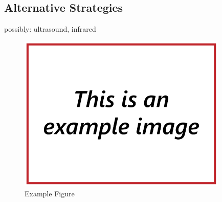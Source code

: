 \subsection{\label{sec:intro:alternatives}Alternative Strategies}
possibly: ultrasound, infrared

\begin{figure}
\includegraphics[width=100mm,natwidth=640,natheight=480]{"./image/Example"}
\caption{\label{fig:software_overall}Example Figure}
\end{figure}